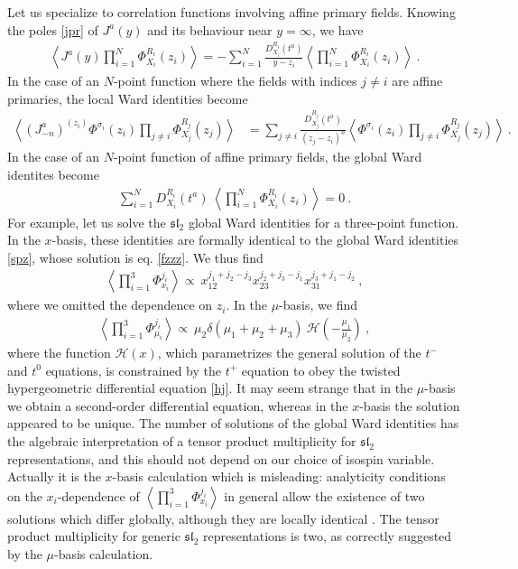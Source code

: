 \documentclass[12pt,a4paper,notitlepage]{report}
\numberwithin{equation}{section}
\theoremstyle{break}
\begin{document}
Let us specialize to correlation functions involving affine primary fields.
Knowing the poles \eqref{jpr} of $J^a(y)$ and its behaviour near $y=\infty$, we have
\begin{align}
 \left\langle J^a(y) \prod_{i=1}^N \Phi^{R_i}_{X_i}(z_i)\right\rangle = - \sum_{i=1}^N \frac{D^{R_i}_{X_i}(t^a)}{y-z_i}\left\langle \prod_{i=1}^N \Phi^{R_i}_{X_i}(z_i)\right\rangle\ .
\label{dja}
\end{align}
In the case of an $N$-point function where the fields with indices $j\neq i$ are affine primaries, the local Ward identities become
\begin{align}
\left\langle\left(J^a_{-n}\right)^{(z_i)}\Phi^{\sigma_i}(z_i)\prod_{j\neq i} \Phi^{R_j}_{X_j}(z_j)\right\rangle &=\sum_{j\neq i} \frac{D_{X_j}^{R_j}(t^a)}{(z_j-z_i)^n} \left\langle \Phi^{\sigma_i}(z_i)\prod_{j\neq i} \Phi^{R_j}_{X_j}(z_j)\right\rangle\ . 
\label{jmnz}
\end{align}
In the case of an $N$-point function of affine primary fields, the global Ward identites become
\begin{align}
 \sum_{i=1}^N D_{X_i}^{R_i}(t^a)\ \left\langle \prod_{i=1}^N \Phi^{R_i}_{X_i}(z_i)\right\rangle   = 0 \ .
\label{drxt}
\end{align}
For example, let us solve the $\mathfrak{sl}_2$ global Ward identities for a three-point function.
In the $x$-basis, these identities are formally identical to the global Ward identities \eqref{spz}, whose solution is eq. \eqref{fzzz}.
We thus find
\begin{align}
 \left\langle \prod_{i=1}^3 \Phi^{j_i}_{x_i} \right\rangle \propto\ x_{12}^{j_1+j_2-j_3} x_{23}^{j_2+j_3-j_1} x_{31}^{j_3+j_1-j_2}\ ,
\label{xxx}
\end{align}
where we omitted the dependence on $z_i$.
In the $\mu$-basis, we find 
\begin{align}
 \left\langle \prod_{i=1}^3\Phi^{j_i}_{\mu_i}\right\rangle \propto\ \mu_2\delta(\mu_1+\mu_2+\mu_3)\ \mathcal{H}\left(-\frac{\mu_1}{\mu_2}\right)\ ,
\label{pmf}
\end{align}
where the function $\mathcal{H}(x)$, which parametrizes the general solution of the $t^-$ and $t^0$ equations, is constrained by the $t^+$ equation to obey the twisted hypergeometric differential equation \eqref{hj}.
It may seem strange that in the $\mu$-basis we obtain a second-order differential equation, whereas in the $x$-basis the solution appeared to be unique.
The number of solutions of the global Ward identities has the algebraic interpretation of a tensor product multiplicity for $\mathfrak{sl}_2$ representations, and this should not depend on our choice of isospin variable.
Actually it is the $x$-basis calculation which is misleading: analyticity conditions on the $x_i$-dependence of $\left\langle \prod_{i=1}^3 \Phi^{j_i}_{x_i} \right\rangle$ in general allow the existence of two solutions which differ globally, although they are locally identical \cite{rib09}.
The tensor product multiplicity for generic $\mathfrak{sl}_2$ representations is two, as correctly suggested by the $\mu$-basis calculation. 
\end{document}
